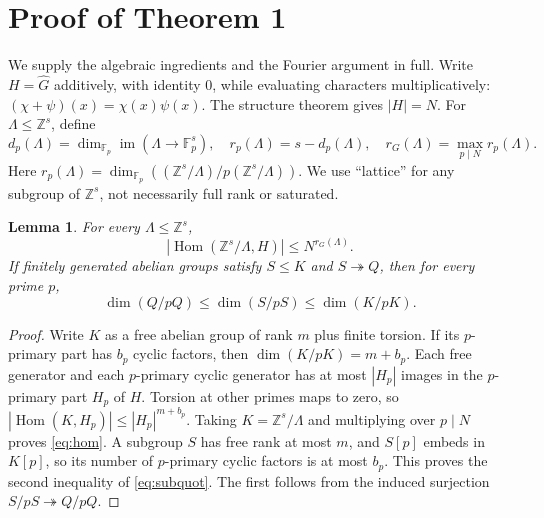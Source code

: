 \documentclass[11pt]{amsart}
\newtheorem{lemma}{Lemma}
\theoremstyle{remark}
\newcommand{\Z}{\mathbb Z}
\newcommand{\F}{\mathbb F}
\newcommand{\Hom}{\operatorname{Hom}}
\begin{document}
\section{Proof of Theorem 1}\label{sec:proof1}
We supply the algebraic ingredients and the Fourier argument in full.
Write $H=\widehat G$ additively, with identity $0$, while evaluating
characters multiplicatively: $(\chi+\psi)(x)=\chi(x)\psi(x)$.
The structure theorem gives $|H|=N$. For $\Lambda\le\Z^s$, define
\[
 d_p(\Lambda)=\dim_{\F_p}\operatorname{im}(\Lambda\longrightarrow\F_p^s),
 \quad r_p(\Lambda)=s-d_p(\Lambda),\quad
 r_G(\Lambda)=\max_{p\mid N}r_p(\Lambda).
\]
Here $r_p(\Lambda)=\dim_{\F_p}((\Z^s/\Lambda)/p(\Z^s/\Lambda))$.
We use ``lattice'' for any subgroup of $\Z^s$, not necessarily full rank
or saturated.

\begin{lemma}\label{lem:hom}
For every $\Lambda\le\Z^s$,
\begin{equation}\label{eq:hom}
 |\Hom(\Z^s/\Lambda,H)|\le N^{r_G(\Lambda)}.
\end{equation}
If finitely generated abelian groups satisfy $S\le K$ and $S\twoheadrightarrow Q$,
then for every prime $p$,
\begin{equation}\label{eq:subquot}
 \dim(Q/pQ)\le\dim(S/pS)\le\dim(K/pK).
\end{equation}
\end{lemma}
\begin{proof}
Write $K$ as a free abelian group of rank $m$ plus finite torsion. If
its $p$-primary part has $b_p$ cyclic factors, then
$\dim(K/pK)=m+b_p$. Each free generator and each $p$-primary cyclic
generator has at most $|H_p|$ images in the $p$-primary part $H_p$ of
$H$. Torsion at other primes maps to zero, so
$|\Hom(K,H_p)|\le|H_p|^{m+b_p}$. Taking $K=\Z^s/\Lambda$ and
multiplying over $p\mid N$ proves \eqref{eq:hom}. A subgroup $S$
has free rank at most $m$, and $S[p]$ embeds in $K[p]$, so its number
of $p$-primary cyclic factors is at most $b_p$. This proves the second
inequality of \eqref{eq:subquot}. The first follows from the induced
surjection $S/pS\twoheadrightarrow Q/pQ$.
\end{proof}
\end{document}
